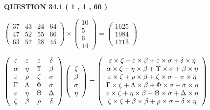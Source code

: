 \documentclass[12pt]{article}
\begin{document}
   
  
  
{\textbf{\large{QUESTION
34.1 
 (           1 ,           1 ,          60 )
}}}

 
$\left( \begin{array}{ccccccccccccccc}
          37  & 
          43  & 
          24  & 
          64  \\ 
          47  & 
          52  & 
          55  & 
          66  \\ 
          63  & 
          57  & 
          28  & 
          45
\end{array}\right) \times
\left( \begin{array}{c}
          10  \\ 
           5  \\ 
           6  \\ 
          14
\end{array}\right)  =
\left( \begin{array}{c}
        1625  \\ 
        1984  \\ 
        1713
\end{array}\right)  $
 
$  %
 \left( \begin{array}
 {
 c
 c
 c
 c
 }
 \varepsilon & 
 \varepsilon & 
 \varepsilon & 
 \delta \\ 
 \alpha & 
 \eta & 
 \Upsilon & 
 \beta \\ 
 \varepsilon & 
 \rho & 
                    \zeta & 
 \sigma \\ 
 \Gamma & 
 \Lambda & 
 \Phi & 
 \sigma \\ 
 \varepsilon & 
 \eta & 
 \Theta & 
 \Delta \\ 
                    \zeta & 
 \beta & 
 \rho & 
 \delta
 \end{array} \right)
 \left( \begin{array}
 {
 c
 }
                    \zeta \\ 
 \beta \\ 
 \sigma \\ 
 \eta
 \end{array} \right)
=
 \left( \begin{array}
 {
 c
 }
  \varepsilon \times                     \zeta +  \varepsilon \times  \beta +  \varepsilon \times  \sigma +  \delta \times  \eta \\ 
  \alpha \times                     \zeta +  \eta \times  \beta +  \Upsilon \times  \sigma +  \beta \times  \eta \\ 
  \varepsilon \times                     \zeta +  \rho \times  \beta +                     \zeta \times  \sigma +  \sigma \times  \eta \\ 
  \Gamma \times                     \zeta +  \Lambda \times  \beta +  \Phi \times  \sigma +  \sigma \times  \eta \\ 
  \varepsilon \times                     \zeta +  \eta \times  \beta +  \Theta \times  \sigma +  \Delta \times  \eta \\ 
                     \zeta \times                     \zeta +  \beta \times  \beta +  \rho \times  \sigma +  \delta \times  \eta
 \end{array} \right)
$
 
\end{document}
